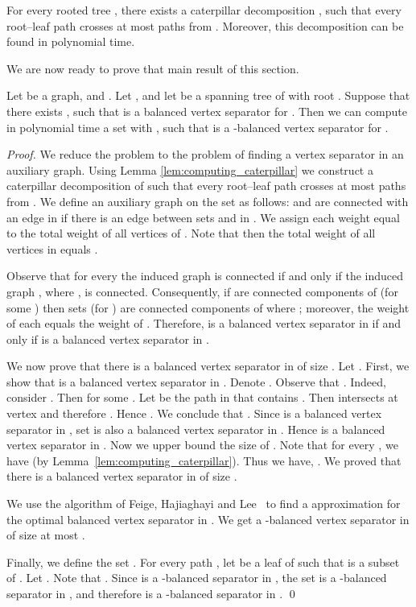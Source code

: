 \documentclass[envcountsect]{llncs}
\begin{document}
\begin{lemma}\label{lem:computing_caterpillar}
For every rooted tree , there exists a caterpillar decomposition , such that every root--leaf path  crosses
at most  paths from .
Moreover, this decomposition can be found in polynomial time.
\end{lemma}

We are now ready to prove that main result of this section.

\begin{lemma}\label{lem:genus_separator_weighted_approximate}
Let  be a graph, and .
Let , and let  be a spanning tree of  with root .
Suppose that there exists , such that  is a balanced vertex separator for .
Then we can compute in polynomial time a set  
with , such that  is a -balanced vertex separator for .
\end{lemma}
\begin{proof}
We reduce the problem to the problem of finding a vertex separator in an auxiliary graph.
Using Lemma \ref{lem:computing_caterpillar} we construct a caterpillar decomposition  of  such that every root--leaf path  crosses
at most  paths from . We define an auxiliary graph  on the set  as follows:
 and  are connected with an edge in  if there is an edge between sets
 and  in . We assign each  weight equal to the total weight of all 
vertices of . Note that then the total weight of all vertices in  equals .

Observe that for every  the induced graph  is connected if and only if 
the induced graph , where  , is connected. Consequently,
if  are connected components of 
(for some ) then sets  (for ) are connected 
components of  where ; moreover, the weight of each  equals
the weight of .
Therefore,  is a balanced vertex separator in  if and only if 
 is a balanced vertex separator in .

We now prove that there is a balanced vertex separator in  of size
. Let .
First, we show that  is a balanced vertex separator in .
Denote . Observe that . Indeed,
consider . Then  for some . Let  be the path in  that contains . 
Then  intersects  at vertex  and therefore . Hence .
We conclude that . Since  is a balanced vertex separator in ,
set  is also a balanced vertex separator in . Hence  is a balanced vertex separator in .
Now we upper bound the size of . Note that for every , we have
 (by Lemma~\ref{lem:computing_caterpillar}). Thus we have,
. We proved that there is a balanced vertex separator in  of size
. 

We use the algorithm of Feige, Hajiaghayi and Lee~\cite{FHL08} to find 
a  approximation for the optimal balanced vertex separator in . 
We get a -balanced vertex separator  in  of size  at most
.

Finally, we define the set . 
For every path , let  be a leaf of  such that  is a subset of . 
Let . 
Note that  .
Since  is a -balanced separator in , the set
 is a -balanced 
separator in , and therefore  
is a -balanced separator in . 
\qed
\end{proof}
\end{document}
